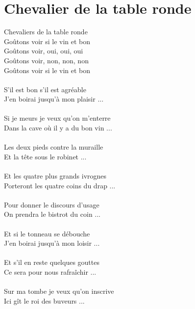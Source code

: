 \section*{Chevalier de la table ronde}
Chevaliers de la table ronde\\
Goûtons voir si le vin et bon\\
Goûtons voir, oui, oui, oui\\
Goûtons voir, non, non, non\\
Goûtons voir si le vin et bon
\\\\
S'il est bon s'il est agréable\\
J'en boirai jusqu'à mon plaisir ...
\\\\
Si je meurs je veux qu'on m'enterre\\
Dans la cave où il y a du bon vin ...
\\\\
Les deux pieds contre la muraille\\
Et la tête sous le robinet ...
\\\\
Et les quatre plus grands ivrognes\\
Porteront les quatre coins du drap ...
\\\\
Pour donner le discours d'usage\\
On prendra le bistrot du coin ...
\\\\
Et si le tonneau se débouche\\
J'en boirai jusqu'à mon loisir ...
\\\\
Et s'il en reste quelques gouttes\\
Ce sera pour nous rafraîchir ...
\\\\
Sur ma tombe je veux qu'on inscrive\\
Ici gît le roi des buveurs ...